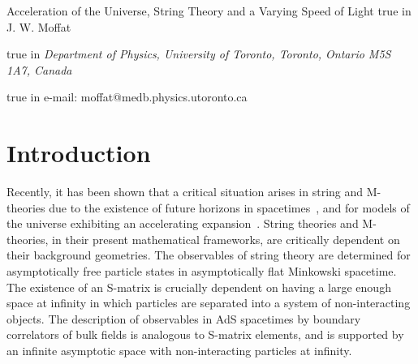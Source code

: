 \documentclass[a4paper,12pt]{article}
\begin{document}
\begin{center}
{\Large Acceleration of the Universe, String Theory and a Varying
Speed of Light }
 true in {\large J. W. Moffat} \date{}  true in {\it Department of Physics, University of Toronto, Toronto,
Ontario M5S 1A7, Canada}

\end{center}

\begin{abstract}%
The existence of future horizons in spacetime geometries poses serious
problems for string theory and quantum field theories. The observation
that the expansion of the universe is accelerating has recently been shown
to lead to a crisis for the mathematical formalism of string and
M-theories, since the existence of a future horizon for an eternally
accelerating universe does not allow the formulation of physical S-matrix
observables. Postulating that the speed of light varies in an
expanding universe in the future as well as in the past can eliminate
future horizons, allowing for a consistent definition of S-matrix
observables.

\end{abstract}  true in e-mail: moffat@medb.physics.utoronto.ca

\section{\bf Introduction}

Recently, it has been shown that a critical situation arises in string and
M-theories due to the existence of future horizons in
spacetimes~\cite{Susskind,Fischler,Witten}, and for models of the universe
exhibiting an accelerating expansion~\cite{Perlmutter}. String theories and
M-theories, in their present mathematical frameworks, are critically
dependent on their background geometries. The observables of string theory
are determined for asymptotically free particle states in asymptotically
flat Minkowski spacetime. The existence of an S-matrix is crucially
dependent on having a large enough space at infinity in which particles are
separated into a system of non-interacting objects. The description of
observables in AdS spacetimes by boundary correlators of bulk fields is
analogous to S-matrix elements, and is supported by an infinite asymptotic
space with non-interacting particles at infinity.
\end{document}

